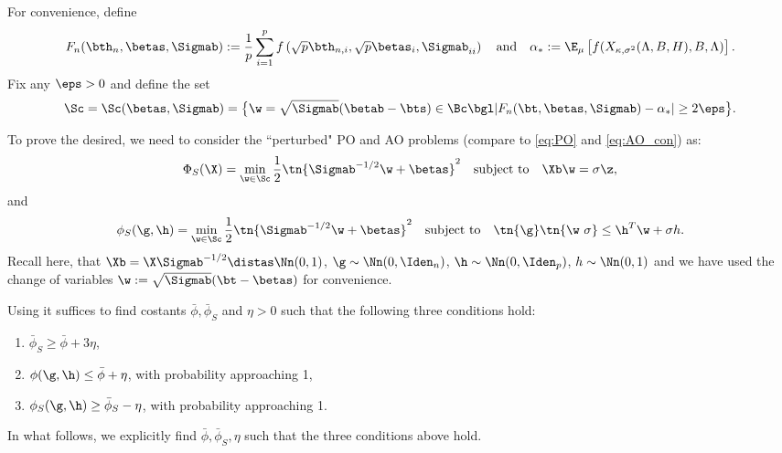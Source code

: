  For convenience, 
 define 
$$F_n(\bth_n,\betas,\Sigmab):=\frac{1}{p} \sum_{i=1}^{p} f\left(\sqrt{p}\bth_{n,i},\sqrt{p}\betas_{i},\Sigmab_{ii}\right)\quad\text{and}\quad\alpha_*:=\E_\mu\left[f(X_{\kappa,\sigma^2}(\Lambda,B,H),B,\Lambda)\right].$$
Fix  any $\eps>0$ and define the set 
\begin{align}\label{eq:S_set}
\Sc = \Sc(\betas,\Sigmab) 
=\big\{\w=\sqrt{\Sigmab}(\betab-\bts) \in\Bc \bgl |F_n(\bt,\betas,\Sigmab)-\alpha_*|\geq 2\eps\big\}.
\end{align}

To prove the desired, we need to consider the ``perturbed" PO and AO problems (compare to \eqref{eq:PO} and \eqref{eq:AO_con}) as:
\begin{align}\label{eq:PO_S}
\Phi_S(\X)=\min_{\w\in\Sc} \frac{1}{2}\tn{\Sigmab^{-1/2}\w+\betas}^2\quad\text{subject to}\quad \Xb\w=\sigma \z,
\end{align}
and
\begin{align}
\phi_S(\g,\h)=\min_{\w\in\Sc} \frac{1}{2}\tn{\Sigmab^{-1/2}\w+\betas}^2\quad\text{subject to}\quad \tn{\g}\tn{\w~{\sigma}}\leq \h^T\w+\sigma h.\label{eq:AO_S}
\end{align}%
Recall here, that $\Xb=\X\Sigmab^{-1/2}\distas\Nn(0,1)$, $\g\sim\Nn(0,\Iden_n)$, $\h\sim\Nn(0,\Iden_p)$, $h\sim \Nn(0,1)$ and we have used the change of variables $\w:=\sqrt{\Sigmab}(\bt-\betas)$ for convenience. 

 Using \cite[Theorem 6.1(iii)]{thrampoulidis2018precise} it suffices to find costants $\bar\phi, \bar\phi_S$ and $\eta>0$ such that the following three conditions hold:
\begin{enumerate}
\item $\bar\phi_S \geq \bar\phi + 3\eta$,
\item $\phi(\g,\h) \leq \bar\phi + \eta$, with probability approaching 1,
\item $\phi_S(\g,\h) \geq \bar\phi_S - \eta$, with probability approaching 1.
\end{enumerate}
In what follows, we  explicitly find $\bar\phi, \bar\phi_S,\eta$ such that the three conditions above hold.

